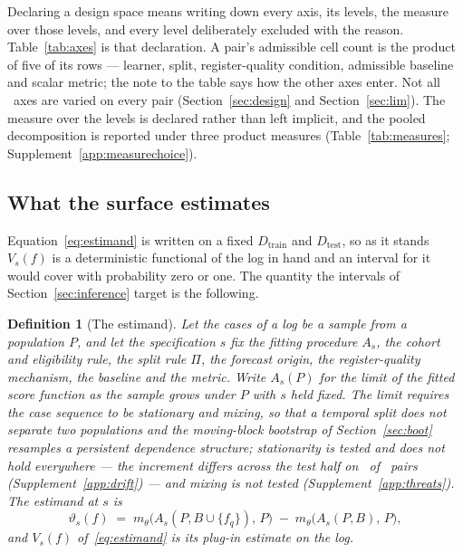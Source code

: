 \documentclass[11pt,3p,review,authoryear]{elsarticle}
\newtheorem{definition}{Definition}
\theoremstyle{definition}
\begin{document}


Declaring a design space means writing down every axis, its levels, the
measure over those levels, and every level deliberately excluded with the
reason. Table~\ref{tab:axes} is that declaration. A pair's admissible cell
count is the product of five of its rows --- learner, split, register-quality
condition, admissible baseline and scalar metric; the note to the table says
how the other axes enter. Not all \nAxes\ axes are varied on every pair
(Section~\ref{sec:design} and Section~\ref{sec:lim}). The measure over the
levels is declared rather than left implicit, and the pooled decomposition is
reported under three product measures (Table~\ref{tab:measures};
Supplement~\ref{app:measurechoice}).

\subsection{What the surface estimates}
\label{sec:estimand}

Equation~\eqref{eq:estimand} is written on a fixed $D_{\mathrm{train}}$ and
$D_{\mathrm{test}}$, so as it stands $V_s(f)$ is a deterministic functional of
the log in hand and an interval for it would cover with probability zero or
one. The quantity the intervals of Section~\ref{sec:inference} target is the
following.

\begin{definition}[The estimand]
\label{def:estimand}
Let the cases of a log be a sample from a population $P$, and let the
specification $s$ fix the fitting procedure $A_s$, the cohort and eligibility
rule, the split rule $\Pi$, the forecast origin, the register-quality mechanism,
the baseline and the metric. Write $A_s(P)$ for the limit of the fitted
score function as the sample grows under $P$ with $s$ held fixed. The limit
requires the case sequence to be stationary and mixing, so that a temporal
split does not separate two populations and the moving-block bootstrap of
Section~\ref{sec:boot} resamples a persistent dependence structure;
stationarity is tested and does not hold everywhere --- the increment
differs across the test half on \nDrifts\ of \nDriftPairs\ pairs
(Supplement~\ref{app:drift}) --- and mixing is not tested
(Supplement~\ref{app:threats}). The \emph{estimand at $s$} is
\[
\vartheta_s(f) \;=\; m_\theta\bigl(A_s(P, B \cup \{f_q\}),\, P\bigr)
\;-\; m_\theta\bigl(A_s(P, B),\, P\bigr),
\]
and $V_s(f)$ of~\eqref{eq:estimand} is its plug-in estimate on the log.
\end{definition}
\end{document}

